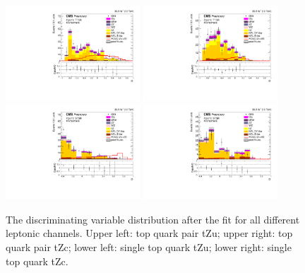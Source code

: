 \documentclass{PoS}
\begin{document}
\begin{figure}[htb]
\centering
\includegraphics[width=0.45\textwidth]{figures/CMS-PAS-TOP-17-017_Figure_003-a}
\includegraphics[width=0.45\textwidth]{figures/CMS-PAS-TOP-17-017_Figure_003-b}\\
\includegraphics[width=0.45\textwidth]{figures/CMS-PAS-TOP-17-017_Figure_003-c}
\includegraphics[width=0.45\textwidth]{figures/CMS-PAS-TOP-17-017_Figure_003-d}
\caption{
  The discriminating variable distribution after the fit for all different
  leptonic channels. Upper left: top quark pair tZu; upper right: top quark pair
  tZc; lower left: single top quark tZu; lower right: single top quark tZc.
}
\label{fig:TOP-17-017_Figure_003}
\end{figure}
\end{document}
